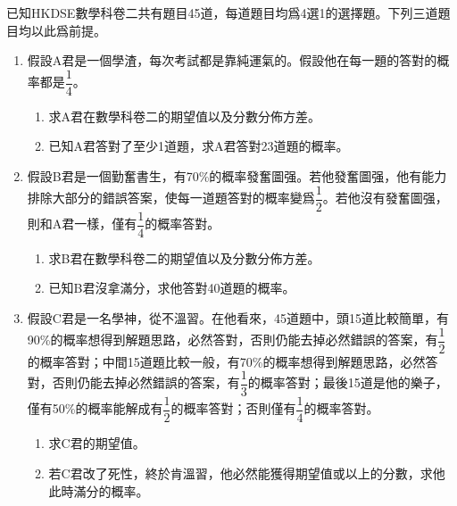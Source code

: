 \documentclass[12pt]{article}
\begin{document}
    已知HKDSE數學科卷二共有題目45道，每道題目均爲4選1的選擇題。下列三道題目均以此爲前提。\begin{enumerate}
        \item 假設A君是一個學渣，每次考試都是靠純運氣的。假設他在每一題的答對的概率都是\(\dfrac{1}{4}\)。\begin{enumerate}
            \item 求A君在數學科卷二的期望值以及分數分佈方差。
            \item 已知A君答對了至少1道題，求A君答對23道題的概率。
        \end{enumerate}
        \item 假設B君是一個勤奮書生，有70\%的概率發奮圖强。若他發奮圖强，他有能力排除大部分的錯誤答案，使每一道題答對的概率變爲\(\dfrac{1}{2}\)。若他沒有發奮圖强，則和A君一樣，僅有$\dfrac{1}{4}$的概率答對。\begin{enumerate}
            \item 求B君在數學科卷二的期望值以及分數分佈方差。
            \item 已知B君沒拿滿分，求他答對40道題的概率。
        \end{enumerate}
        \item 假設C君是一名學神，從不溫習。在他看來，45道題中，頭15道比較簡單，有90\%的概率想得到解題思路，必然答對，否則仍能去掉必然錯誤的答案，有$\dfrac{1}{2}$的概率答對；中間15道題比較一般，有70\%的概率想得到解題思路，必然答對，否則仍能去掉必然錯誤的答案，有$\dfrac{1}{3}$的概率答對；最後15道是他的樂子，僅有50\%的概率能解成有$\dfrac{1}{2}$的概率答對；否則僅有$\dfrac{1}{4}$的概率答對。\begin{enumerate}
            \item 求C君的期望值。
            \item 若C君改了死性，終於肯溫習，他必然能獲得期望值或以上的分數，求他此時滿分的概率。
        \end{enumerate}
    \end{enumerate}
\end{document}
